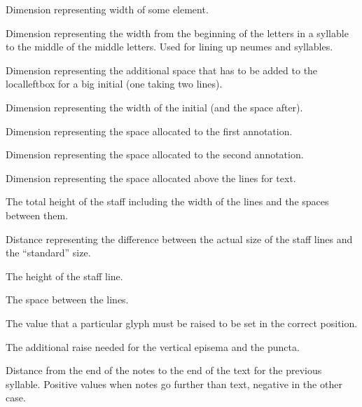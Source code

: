 Dimension representing width of some element.

Dimension representing the width from the beginning of the letters in
a syllable to the middle of the middle letters.  Used for lining up
neumes and syllables.

Dimension representing the additional space that has to be added to
the localleftbox for a big initial (one taking two lines).

Dimension representing the width of the initial (and the space after).

Dimension representing the space allocated to the first annotation.

Dimension representing the space allocated to the second annotation.

Dimension representing the space allocated above the lines for text.	

The total height of the staff including the width of the lines and the spaces between them.

Distance representing the difference between the actual size of the staff lines and the ``standard'' size.

The height of the staff line.

The space between the lines.

The value that a particular glyph must be raised to be set in the correct position.

The additional raise needed for the vertical episema and the puncta.

Distance from the end of the notes to the end of the text for the previous syllable.  Positive values when notes go further than text, negative in the other case.

